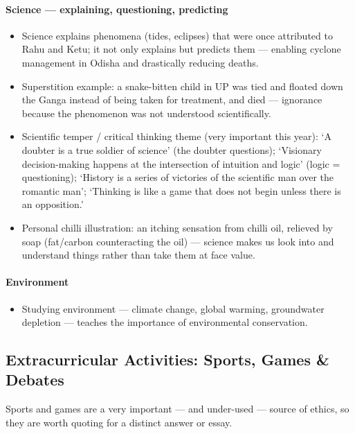 \paragraph{Science --- explaining, questioning, predicting}
\begin{itemize}
\item Science explains phenomena (tides, eclipses) that were once attributed to Rahu and Ketu; it not only explains but predicts them --- enabling cyclone management in Odisha and drastically reducing deaths.
\item Superstition example: a snake-bitten child in UP was tied and floated down the Ganga instead of being taken for treatment, and died --- ignorance because the phenomenon was not understood scientifically.
\item Scientific temper / critical thinking theme (very important this year): `A doubter is a true soldier of science' (the doubter questions); `Visionary decision-making happens at the intersection of intuition and logic' (logic = questioning); `History is a series of victories of the scientific man over the romantic man'; `Thinking is like a game that does not begin unless there is an opposition.'
\item Personal chilli illustration: an itching sensation from chilli oil, relieved by soap (fat/carbon counteracting the oil) --- science makes us look into and understand things rather than take them at face value.
\end{itemize}

\paragraph{Environment}
\begin{itemize}
\item Studying environment --- climate change, global warming, groundwater depletion --- teaches the importance of environmental conservation.
\end{itemize}

\subsection{Extracurricular Activities: Sports, Games \& Debates}

Sports and games are a very important --- and under-used --- source of ethics, so they are worth quoting for a distinct answer or essay.

